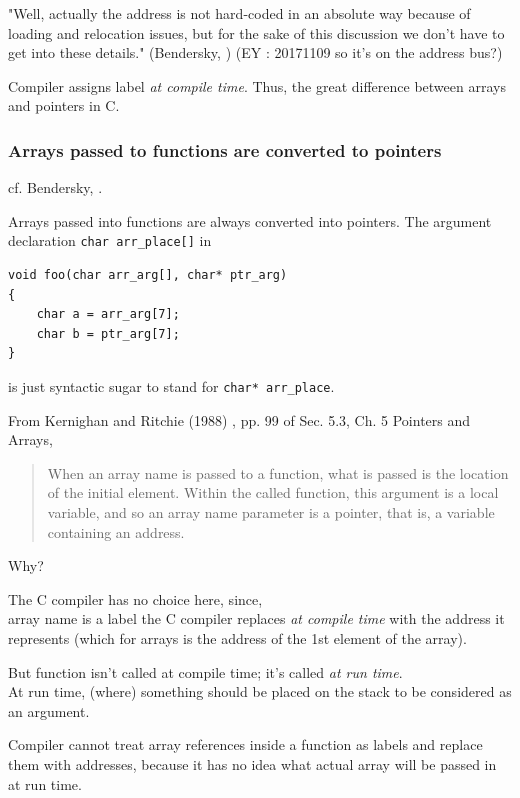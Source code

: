 \documentclass[10pt]{amsart}
\begin{document}
\begin{multicols*}{2}
"Well, actually the address is not hard-coded in an absolute way because of loading and relocation issues, but for the sake of this discussion we don't have to get into these details." (Bendersky, \cite{Bend}) (EY : 20171109 so it's on the address bus?)

Compiler assigns label \emph{at compile time}.  Thus, the great difference between arrays and pointers in C.  

\subsubsection{Arrays passed to functions are converted to pointers}  

cf. Bendersky, \cite{Bend}.  

Arrays passed into functions are always converted into pointers.  The argument declaration \verb|char arr_place[]| in  

\begin{lstlisting}
void foo(char arr_arg[], char* ptr_arg)
{
	char a = arr_arg[7];
	char b = ptr_arg[7];
}
\end{lstlisting} 

is just syntactic sugar to stand for \verb|char* arr_place|.  

From Kernighan and Ritchie (1988) \cite{KeRi1988}, pp. 99 of Sec. 5.3, Ch. 5 Pointers and Arrays,  

\begin{quotation}
	When an array name is passed to a function, what is passed is the location of the initial element.  Within the called function, this argument is a local variable, and so an array name parameter is a pointer, that is, a variable containing an address.  
	\end{quotation}

Why?  

The C compiler has no choice here, since, \\
array name is a label the C compiler replaces \emph{at compile time}  with the address it represents (which for arrays is the address of the 1st element of the array).  

But function isn't called at compile time; it's called \emph{at run time}.  \\
At run time, (where) something should be placed on the stack to be considered as an argument.  

Compiler cannot treat array references inside a function as labels and replace them with addresses, because it has no idea what actual array will be passed in at run time.  


\end{multicols*}
\end{document}

